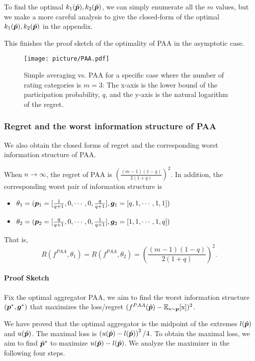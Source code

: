 To find the optimal $k_1(\hat{{\bm{p}}}),k_2(\hat{{\bm{p}}})$, we can simply enumerate all the $m$ values, but we make a more careful analysis to give the closed-form of the optimal $k_1(\hat{{\bm{p}}}),k_2(\hat{{\bm{p}}})$ in the appendix. 

This finishes the proof sketch of the optimality of PAA in the asymptotic case. 

\begin{figure}[h]
  \centering
  \texttt{[image: picture/PAA.pdf]}
  \caption{Simple averaging vs. PAA for a specific case where the number of rating categories is $m=3$: The x-axis is the lower bound of the participation probability, $q$, and the y-axis is the natural logarithm of the regret.}
  \label{fig:PAA}
\end{figure}

\subsubsection{Regret and the worst information structure of PAA}

We also obtain the closed forms of regret and the corresponding worst information structure of PAA.

\begin{proposition}
    \label{prop:PAA}
    When $n\to\infty$, the regret of PAA is $\left(\frac{(m-1)(1-q)}{2(1+q)}\right)^2$. In addition, the corresponding worst pair of information structure is 
    \begin{itemize}
        \item $\theta_1=({\bm{p}}_1=[\frac{1}{q+1},0,\cdots,0,\frac{q}{q+1}],{\bm{g}}_1=[q,1,\cdots,1,1])$
        \item $\theta_2=({\bm{p}}_2=[\frac{q}{q+1},0,\cdots,0,\frac{1}{q+1}],{\bm{g}}_2=[1,1,\cdots, 1,q])$
    \end{itemize}
    
    That is, $$R(f^{PAA},\theta_1)=R(f^{PAA},\theta_2)=\left(\frac{(m-1)(1-q)}{2(1+q)}\right)^2.$$
\end{proposition}

\paragraph{Proof Sketch}

Fix the optimal aggregator PAA, we aim to find the worst information structure $({\bm{p}}^*,{\bm{g}}^*)$ that maximizes the loss/regret $(f^{PAA}(\hat{{\bm{p}}})-\mathbb{E}_{{\textnormal{x}}\sim{\bm{p}}}[{\textnormal{x}}])^2$. 

We have proved that the optimal aggregator is the midpoint of the extremes $l(\hat{{\bm{p}}})$ and $u(\hat{{\bm{p}}})$. The maximal loss is $\left(u(\hat{{\bm{p}}})-l(\hat{{\bm{p}}})\right)^2/4$. To obtain the maximal loss, we aim to find $\hat{{\bm{p}}}^*$ to maximize $u(\hat{{\bm{p}}})-l(\hat{{\bm{p}}})$. We analyze the maximizer in the following four steps.

